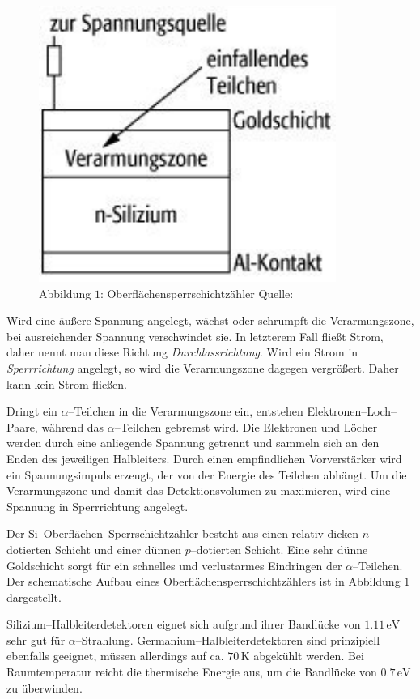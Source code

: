 \documentclass[12pt,a4paper]{scrartcl}
\numberwithin{equation}{section} %
\begin{document}
\begin{figure}[h!]
	\centering
	\includegraphics{../media/B3.3/Oberflaechensperrschichtzaehler.pdf}
	\caption{Abbildung $1$: Oberflächensperrschichtzähler Quelle: \cite{SpektrumOberfl.Zähler}}
\end{figure}

\noindent
Wird eine äußere Spannung angelegt, wächst oder schrumpft die Verarmungszone, bei ausreichender Spannung verschwindet sie. In letzterem Fall fließt Strom, daher nennt man diese Richtung \emph{Durchlassrichtung}. Wird ein Strom in \emph{Sperrrichtung} angelegt, so wird die Verarmungszone dagegen vergrößert. Daher kann kein Strom fließen.

Dringt ein $\alpha$--Teilchen in die Verarmungszone ein, entstehen Elektronen--Loch--Paare, während das $\alpha$--Teilchen gebremst wird. Die Elektronen und Löcher werden durch eine anliegende Spannung getrennt und sammeln sich an den Enden des jeweiligen Halbleiters. Durch einen empfindlichen Vorverstärker wird ein Spannungsimpuls erzeugt, der von der Energie des Teilchen abhängt. Um die Verarmungszone und damit das Detektionsvolumen zu maximieren, wird eine Spannung in Sperrrichtung angelegt.

Der $\mathrm{Si}$--Oberflächen--Sperrschichtzähler besteht aus einen relativ dicken $n$--dotierten Schicht und einer dünnen $p$--dotierten Schicht. Eine sehr dünne Goldschicht sorgt für ein schnelles und verlustarmes Eindringen der $\alpha$--Teilchen. Der schematische Aufbau eines Oberflächensperrschichtzählers ist in Abbildung $1$ dargestellt.

Silizium--Halbleiterdetektoren eignet sich aufgrund ihrer Bandlücke von $1.11\mathrm{\,eV}$ sehr gut für $\alpha$--Strahlung. Germanium--Halbleiterdetektoren sind prinzipiell ebenfalls geeignet, müssen allerdings auf ca. $70\,\mathrm K$ abgekühlt werden. Bei Raumtemperatur reicht die thermische Energie aus, um die Bandlücke von $0.7\mathrm{\,eV}$ zu überwinden. \cite{Knoll}
\end{document}
